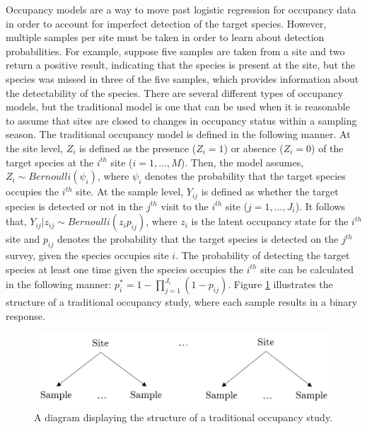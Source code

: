 \documentclass[12pt]{article}\usepackage[]{graphicx}\usepackage[]{color}
\begin{document}
Occupancy models are a way to move past logistic regression for occupancy data in order to account for imperfect detection of the target species. However, multiple samples per site must be taken in order to learn about detection probabilities. For example, suppose five samples are taken from a site and two return a positive result, indicating that the species is present at the site, but the species was missed in three of the five samples, which provides information about the detectability of the species. There are several different types of occupancy models, but the traditional model is one that can be used when it is reasonable to assume that sites are closed to changes in occupancy status within a sampling season. The traditional occupancy model is defined in the following manner. At the site level, $Z_i$ is defined as the presence ($Z_i = 1$) or absence ($Z_i = 0$) of the target species at the $i^{th}$ site ($i = 1, \dots, M$). Then, the model assumes, $Z_i \sim Bernoulli(\psi_i)$, where $\psi_i$ denotes the probability that the target species occupies the $i^{th}$ site. At the sample level, $Y_{ij}$ is defined as whether the target species is detected or not in the $j^{th}$ visit to the $i^{th}$ site ($j = 1, \dots, J_{i}$). It follows that, $Y_{ij}|z_{ij} \sim Bernoulli(z_{i}p_{ij})$, where $z_i$ is the latent occupancy state for the $i^{th}$ site and $p_{ij}$ denotes the probability that the target species is detected on the $j^{th}$ survey, given the species occupies site $i$. The probability of detecting the target species at least one time given the species occupies the $i^{th}$ site can be calculated in the following manner: $p_i^* = 1 - \prod_{j = 1}^{J_i}(1 - p_{ij})$. Figure \ref{fig:ssocc} illustrates the structure of a traditional occupancy study, where each sample results in a binary response. 

\begin{figure}[]
	\centering
	\includegraphics[scale = 0.7]{images/ssocc}
	\caption{A diagram displaying the structure of a traditional occupancy study.}
	\label{fig:ssocc}
\end{figure}
\end{document}

